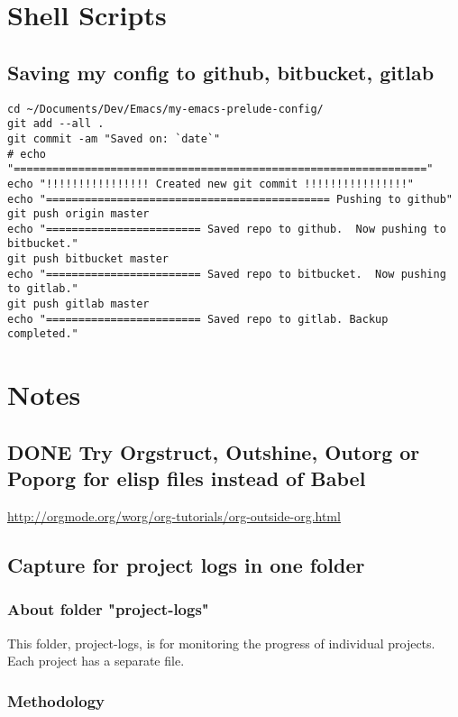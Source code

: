 \documentclass[nofonts]{tufte-handout}
\begin{document}
\section{Shell Scripts}
\label{sec-4}

\subsection{Saving my config to github, bitbucket, gitlab}
\label{sec-4-1}

\begin{verbatim}
cd ~/Documents/Dev/Emacs/my-emacs-prelude-config/
git add --all .
git commit -am "Saved on: `date`"
# echo "================================================================"
echo "!!!!!!!!!!!!!!!! Created new git commit !!!!!!!!!!!!!!!!"
echo "============================================ Pushing to github"
git push origin master
echo "======================== Saved repo to github.  Now pushing to bitbucket."
git push bitbucket master
echo "======================== Saved repo to bitbucket.  Now pushing to gitlab."
git push gitlab master
echo "======================== Saved repo to gitlab. Backup completed."
\end{verbatim}
\section{Notes}
\label{sec-5}
\subsection{{\bfseries\sffamily DONE} Try Orgstruct, Outshine, Outorg or Poporg for elisp files instead of Babel}
\label{sec-5-1}

\url{http://orgmode.org/worg/org-tutorials/org-outside-org.html}
\subsection{Capture for project logs in one folder}
\label{sec-5-2}

\subsubsection{About folder "project-logs"}
\label{sec-5-2-1}

This folder, project-logs, is for monitoring the progress of individual projects.  Each project has a separate file.

\subsubsection{Methodology}
\label{sec-5-2-2}
\end{document}
